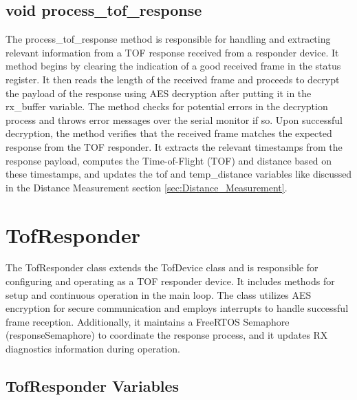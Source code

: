 \subsection{void process\_tof\_response}
\label{subsec:TofInitiator_process_tof_response}
The process\_tof\_response method is responsible for handling and extracting relevant information from a TOF response received from a responder device. 
It method begins by clearing the indication of a good received frame in the status register. It then reads the length of the received frame and proceeds to decrypt the payload of the response using AES decryption after putting it in the rx\_buffer variable. 
The method checks for potential errors in the decryption process and throws error messages over the serial monitor if so. 
\vspace{4pt}
\newline
Upon successful decryption, the method verifies that the received frame matches the expected response from the TOF responder. It extracts the relevant timestamps from the response payload, computes the Time-of-Flight (TOF) and distance based on these timestamps, and updates the tof and temp\_distance variables like discussed in the Distance Measurement section \ref{sec:Distance_Measurement}. 

\section{TofResponder}
\label{sec:TofResponder}
The TofResponder class extends the TofDevice class and is responsible for configuring and operating as a TOF responder device. 
It includes methods for setup and continuous operation in the main loop. 
The class utilizes AES encryption for secure communication and employs interrupts to handle successful frame reception. 
Additionally, it maintains a FreeRTOS Semaphore (responseSemaphore) to coordinate the response process, and it updates RX diagnostics information during operation.

\subsection{TofResponder Variables}
\label{subsec:TofResponder_Variables}

